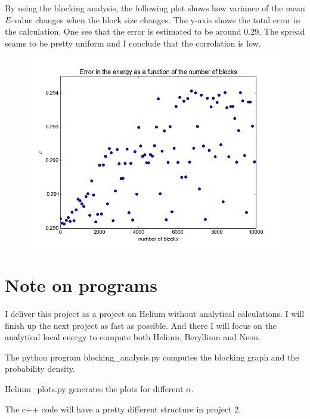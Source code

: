 \documentclass[a4paper, 12pt, titlepage]{article}
\begin{document}
 By using the blocking analysis, the following plot shows how variance of the mean $E$-value changes when the block size changes. The y-axis shows the total error in the calculation. 
 One see that the error is estimated to be around $0.29$. The spread seams to be pretty uniform and I conclude that the corrolation is low. 
 \begin{figure}[H] 
 	\centering
 	\includegraphics[width=\textwidth]{../python_programs/HeliumBlocking.png}
 \end{figure}


 \section*{Note on programs}
 I deliver this project as a project on Helium without analytical calculations. I will finish up the next project as fast as possible. And there I will focus on the analytical local energy to compute both Helium, Beryllium and Neon.

 The python program blocking\_analysis.py computes the blocking graph and the probability density. 

 Helium\_plots.py generates the plots for different $\alpha $. 

 The c++ code will have a pretty different structure in project 2. 
\end{document}
